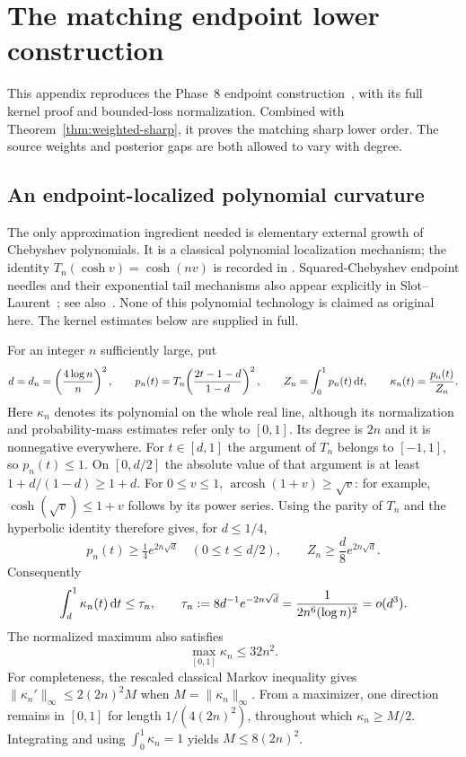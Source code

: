 \section{The matching endpoint lower construction}
\label{sec:ext-weights}
This appendix reproduces the Phase~8 endpoint construction~\cite{huang8},
with its full kernel proof and bounded-loss normalization. Combined with
Theorem~\ref{thm:weighted-sharp}, it proves the matching sharp lower order.
The source weights and posterior gaps are both allowed to vary with degree.

\subsection{An endpoint-localized polynomial curvature}
The only approximation ingredient needed is elementary external growth of
Chebyshev polynomials. It is a classical polynomial localization mechanism;
the identity $T_n(\cosh v)=\cosh(nv)$ is recorded in
\cite[Eq.~18.5.1]{dlmf}. Squared-Chebyshev endpoint needles and their exponential tail mechanisms
also appear explicitly in Slot--Laurent~\cite[Section~4.1]{slot2019};
see also~\cite{slot2020}. None of this polynomial technology is claimed
as original here. The kernel estimates below are supplied in full.

For an integer $n$ sufficiently large, put
\begin{equation}
 d=d_n=\left(\frac{4\log n}{n}\right)^2,\qquad
 p_n(t)=T_n\!\left(\frac{2t-1-d}{1-d}\right)^2,\qquad
 Z_n=\int_0^1p_n(t)\,\mathrm d t,\qquad
 \kappa_n(t)=\frac{p_n(t)}{Z_n}.
 \label{eq:ext-endpointneedle}
\end{equation}
Here $\kappa_n$ denotes its polynomial on the whole real line, although its
normalization and probability-mass estimates refer only to $[0,1]$.
Its degree is $2n$ and it is nonnegative everywhere. For $t\in[d,1]$ the
argument of $T_n$ belongs to $[-1,1]$, so $p_n(t)\le1$. On $[0,d/2]$ the
absolute value of that argument is at least $1+d/(1-d)\ge1+d$.
For $0\le v\le1$, $\operatorname{arcosh}(1+v)\ge\sqrt v$: for example,
$\cosh(\sqrt v)\le1+v$ follows by its power series. Using the parity of
$T_n$ and the hyperbolic identity therefore gives, for $d\le1/4$,
\[
 p_n(t)\ge\tfrac14e^{2n\sqrt d}\quad(0\le t\le d/2),\qquad
 Z_n\ge\frac d8 e^{2n\sqrt d}.
\]
Consequently
\begin{equation}
 \int_d^1\kappa_n(t)\,\mathrm d t\le\tau_n,
 \qquad
 \tau_n:=8d^{-1}e^{-2n\sqrt d}
       =\frac{1}{2n^6(\log n)^2}=o(d^3).
 \label{eq:ext-tail}
\end{equation}
The normalized maximum also satisfies
\begin{equation}
 \max_{[0,1]}\kappa_n\le32n^2.
 \label{eq:ext-max}
\end{equation}
For completeness, the rescaled classical Markov inequality
\cite{shadrin} gives $\|\kappa_n'\|_\infty\le2(2n)^2M$ when
$M=\|\kappa_n\|_\infty$. From a maximizer, one direction remains in $[0,1]$
for length $1/(4(2n)^2)$, throughout which $\kappa_n\ge M/2$.
Integrating and using $\int_0^1\kappa_n=1$ yields $M\le8(2n)^2$.

